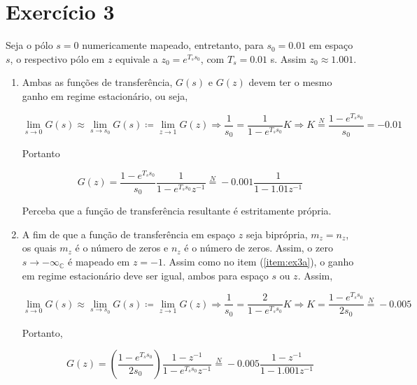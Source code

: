    \section*{Exercício 3}
    
    Seja o pólo $s=0$ numericamente mapeado, entretanto, para $s_0 = 0.01$ em espaço $s$, o respectivo pólo em $z$ equivale a $z_0 = e^{T_s s_0}$, com $T_s = 0.01$ s. Assim $z_0 \approx 1.001$.
    
        \begin{enumerate}
        
        \item %
        \label{item:ex3a}
        
        Ambas as funções de transferência, $G(s)$ e $G(z)$ devem ter o mesmo ganho em regime estacionário, ou seja,
        
            \begin{equation}
                \lim\limits_{s \rightarrow 0} G(s) \approx  \lim\limits_{s \rightarrow s_0} G(s) \coloneqq \lim\limits_{z \rightarrow 1} G(z) \Rightarrow \frac{1}{s_0} = \frac{1}{1 - e^{T_s s_0}} K \Rightarrow K \stackrel{N}{=} \frac{1 - e^{T_s s_0}}{s_0} = - 0.01
            \end{equation}
        
        Portanto
        
            \begin{equation}
                G(z) = \frac{1 - e^{T_s s_0}}{s_0} \frac{1}{1 - e^{T_s s_0} z^{-1}} \stackrel{N}{=} -0.001 \frac{1}{1 - 1.01 z^{-1}}
            \end{equation}
        
        Perceba que a função de transferência resultante é estritamente própria.
        
        \item %
        
        A fim de que a função de transferência em espaço $z$ seja biprópria, $m_z = n_z$, os quais $m_z$ é o número de zeros e $n_z$ é o número de zeros. Assim, o zero $s \rightarrow - \infty_{\mathbb{C}}$ é mapeado em $z = -1$. Assim como no item (\ref{item:ex3a}), o ganho em regime estacionário deve ser igual, ambos para espaço $s$ ou $z$. Assim,
        
            \begin{equation}
                \lim\limits_{s \rightarrow 0} G(s) \approx  \lim\limits_{s \rightarrow s_0} G(s) \coloneqq \lim\limits_{z \rightarrow 1} G(z) \Rightarrow  \frac{1}{s_0} = \frac{2}{1 - e^{T_s s_0}} K \Rightarrow K = \frac{1 - e^{T_s s_0}}{2 s_0} \stackrel{N}{=} - 0.005
            \end{equation}
        
        Portanto,
        
            \begin{equation}
                G(z) =  \left( \frac{1 - e^{T_s s_0}}{2 s_0}\right) \frac{1-z^{-1}}{1 - e^{T_s s_0}  z^{-1}} \stackrel{N}{=} -0.005 \frac{1-z^{-1}}{1 - 1.001  z^{-1}}
            \end{equation}
    \end{enumerate}